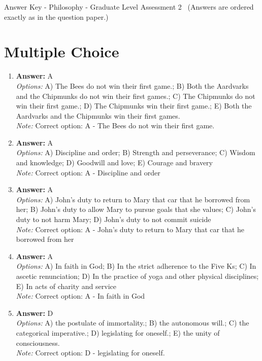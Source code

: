 \documentclass[12pt]{article}
\begin{document}
\begin{center}
Answer Key - Philosophy - Graduate Level Assessment 2 \
\small (Answers are ordered exactly as in the question paper.)
\end{center}

\section*{Multiple Choice}
\begin{enumerate}[label=\arabic*.]
\item \textbf{Answer:} A
\\ \textit{Options:} A) The Bees do not win their first game.; B) Both the Aardvarks and the Chipmunks do not win their first games.; C) The Chipmunks do not win their first game.; D) The Chipmunks win their first game.; E) Both the Aardvarks and the Chipmunks win their first games.
\\ \textit{Note:} Correct option: A - The Bees do not win their first game.
\item \textbf{Answer:} A
\\ \textit{Options:} A) Discipline and order; B) Strength and perseverance; C) Wisdom and knowledge; D) Goodwill and love; E) Courage and bravery
\\ \textit{Note:} Correct option: A - Discipline and order
\item \textbf{Answer:} A
\\ \textit{Options:} A) John's duty to return to Mary that car that he borrowed from her; B) John's duty to allow Mary to pursue goals that she values; C) John's duty to not harm Mary; D) John's duty to not commit suicide
\\ \textit{Note:} Correct option: A - John's duty to return to Mary that car that he borrowed from her
\item \textbf{Answer:} A
\\ \textit{Options:} A) In faith in God; B) In the strict adherence to the Five Ks; C) In ascetic renunciation; D) In the practice of yoga and other physical disciplines; E) In acts of charity and service
\\ \textit{Note:} Correct option: A - In faith in God
\item \textbf{Answer:} D
\\ \textit{Options:} A) the postulate of immortality.; B) the autonomous will.; C) the categorical imperative.; D) legislating for oneself.; E) the unity of consciousness.
\\ \textit{Note:} Correct option: D - legislating for oneself.
\end{enumerate}
\end{document}
